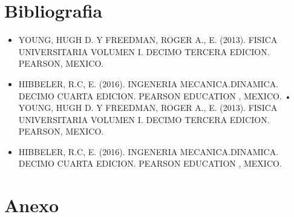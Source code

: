 \documentclass[10pt]{article}
\begin{document}
\section{Bibliografia}

\begin{itemize}
   \item YOUNG, HUGH D. Y FREEDMAN, ROGER A., E. (2013). FISICA UNIVERSITARIA VOLUMEN I. DECIMO TERCERA EDICION. PEARSON, MEXICO.  
   \item HIBBELER, R.C, E. (2016). INGENERIA MECANICA.DINAMICA. DECIMO CUARTA EDICION. PEARSON EDUCATION , MEXICO.    • YOUNG, HUGH D. Y FREEDMAN, ROGER A., E. (2013). FISICA UNIVERSITARIA VOLUMEN I. DECIMO TERCERA EDICION. PEARSON, MEXICO.  
   \item HIBBELER, R.C, E. (2016). INGENERIA MECANICA.DINAMICA. DECIMO CUARTA EDICION. PEARSON EDUCATION , MEXICO. 
\end{itemize}
\section{Anexo}
\end{document}
